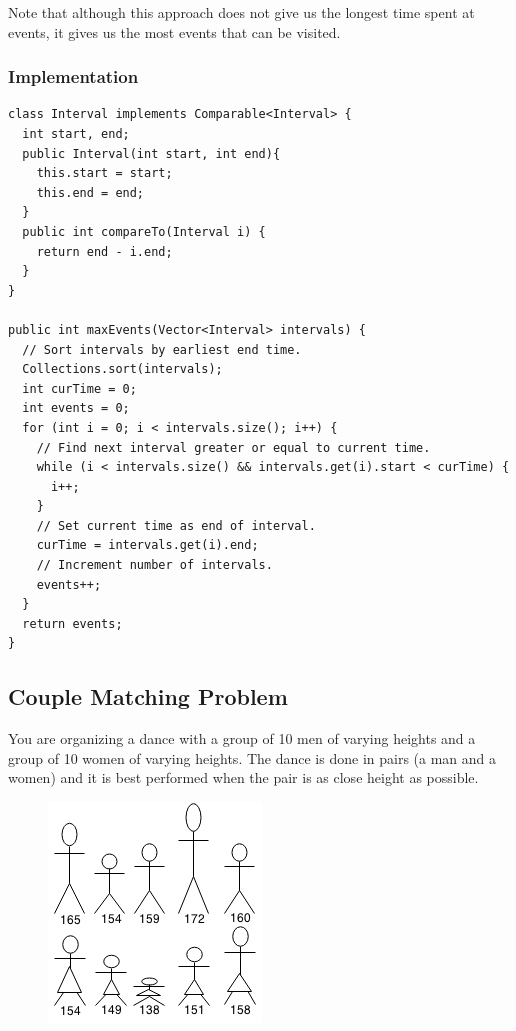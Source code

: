 \documentclass[11pt,oneside]{book}
\makeatletter
\def\maxwidth#1{\ifdim\Gin@nat@width>#1 #1\else\Gin@nat@width\fi}
\makeatother
\begin{document}
Note that although this approach does not give us the longest time spent at events, it gives us the most events that can be visited.

\subsubsection{Implementation}

\begin{lstlisting}
class Interval implements Comparable<Interval> {
  int start, end;
  public Interval(int start, int end){
    this.start = start;
    this.end = end;
  }
  public int compareTo(Interval i) {
    return end - i.end;
  }
}

public int maxEvents(Vector<Interval> intervals) {
  // Sort intervals by earliest end time.
  Collections.sort(intervals);
  int curTime = 0;
  int events = 0;
  for (int i = 0; i < intervals.size(); i++) {
    // Find next interval greater or equal to current time.
    while (i < intervals.size() && intervals.get(i).start < curTime) {
      i++;
    }
    // Set current time as end of interval.
    curTime = intervals.get(i).end;
    // Increment number of intervals.
    events++;
  }
  return events;
}
\end{lstlisting}

\subsection{Couple Matching Problem}

You are organizing a dance with a group of 10 men of varying heights and a group of 10 women of varying heights. The dance is done in pairs (a man and a women) and it is best performed when the pair is as close height as possible.

\vspace{5px}\begin{figure}[H]\centering
        \includegraphics[width=0.66\maxwidth{\textwidth}]{couplematch.png}
        \end{figure}
\end{document}
